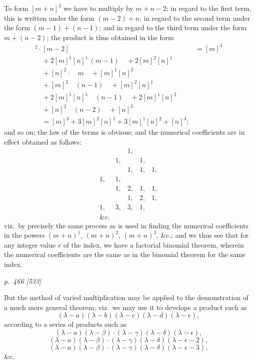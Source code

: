 \documentclass[11pt,a4paper]{book}
\begin{document}
To form $[m + n]^3$ we have to multiply by $m + n - 2$; in regard to the first term, this
is written under the form $(m - 2) + n$; in regard to the second term under the form
$(m - 1) + (n - 1)$; and in regard to the third term under the form $m + (n - 2)$; the
product is thus obtained in the form
\begin{align*}
[m]^2 \cdot [m - 2] &= [m]^3 \\
\quad + 2[m]^1[n]^1\,(m - 1)\quad + 2[m]^2[n]^1 \\
\quad + [n]^2 \cdot \quad m \quad + [m]^1[n]^2 \\
\quad + [m]^2 \quad (n - 1)\quad + [m]^2[n]^1 \\
\quad + 2[m]^1[n]^1\quad (n - 1)\quad + 2[m]^1[n]^2 \\
\quad + [n]^2\quad (n - 2)\quad + [n]^3 \\
\quad = [m]^3 + 3[m]^2[n]^1 + 3[m]^1[n]^2 + [n]^3;
\end{align*}
and so on; the law of the terms is obvious; and the numerical coefficients are in
effect obtained as follows:
\[
\begin{array}{ccccc}
& & 1, & & \\
& 1, & & 1, & \\
& & 1, & 1, & 1, \\
1, & 1, & & & \\
& 1, & 2, & 1, & 1, \\
& & 1, & 2, & 1, \\
1, & 3, & 3, & 1, & \\
\&c.
\end{array}
\]
viz.\ by precisely the same process as is used in finding the numerical coefficients in
the powers $(m + n)^1$, $(m + n)^2$, $(m + n)^3$, \&c.; and we thus see that for any integer value
$r$ of the index, we have a factorial binomial theorem, wherein the numerical coefficients
are the same as in the binomial theorem for the same index.

\clearpage

\bigskip
\textit{p.~466 [533]}
\smallskip

But the method of varied multiplication may be applied to the demonstration of
a much more general theorem; viz.\ we may use it to develope a product such as
\[
(\lambda - a)(\lambda - b)(\lambda - c)(\lambda - d)(\lambda - e),
\]
according to a series of products such as
\[
(\lambda - a)(\lambda - \beta) \cdot (\lambda - \gamma)(\lambda - \delta)(\lambda - \epsilon),
\]
\[
(\lambda - a)(\lambda - \beta) \cdot (\lambda - \gamma)(\lambda - \delta)(\lambda - \epsilon - 2),
\]
\[
(\lambda - a)(\lambda - \beta) \cdot (\lambda - \gamma)(\lambda - \delta)(\lambda - \epsilon - 3),
\]
\&c.
\end{document}
